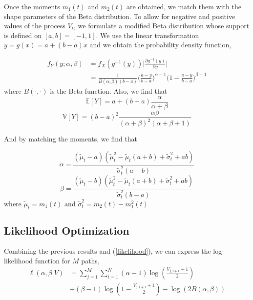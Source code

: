 \documentclass[10pt,twocolumn,letterpaper]{article}
\newcommand{\E}{\mathbb{E}}
\newcommand{\V}{\mathbb{V}}
\begin{document}
Once the moments $m_1(t)$ and $m_2(t)$ are obtained, we match them with the shape parameters of the Beta distribution. To allow for negative and positive values of the process $V_t$, we formulate a modified Beta distribution whose support is defined on $[a,b]=[-1,1]$.  We use the linear transformation $y= g(x)= a + (b-a) x $ and we obtain the probability density function,

\begin{equation}
\begin{split}
f_Y(y; \alpha , \beta )&= f_X(g^{-1}(y) ) \Big| \frac{\partial g^{-1}(y)}{\partial y }  \Big| \\
&= \frac{1}{B(\alpha, \beta) (b-a)} \Big(\frac{a-y}{b-a}\Big)^{\alpha -1}\Big(1-\frac{a-y}{b-a} \Big)^{\beta -1} \label{modified_Beta}
\end{split}
\end{equation}
where $B(\cdot,\cdot)$ is the Beta function. Also, we find that
\begin{equation}
\E[Y]= a + (b-a) \frac{\alpha}{\alpha + \beta}
\end{equation}
\begin{equation}
\V[Y]= (b-a)^2 \frac{\alpha \beta}{(\alpha + \beta)^2 (\alpha + \beta + 1)}
\end{equation}

And by matching the moments, we find that 

\begin{equation}
\alpha = \frac{(\tilde{\mu}_t-a) \left(\tilde{\mu}_t^2-\tilde{\mu}_t (a+b)+\tilde{\sigma}_t^2+a b\right)}{\tilde{\sigma}_t^2 (a-b)}
\end{equation}
\begin{equation}
\beta = \frac{(\tilde{\mu}_t-b) \left(\tilde{\mu}_t^2-\tilde{\mu}_t (a+b)+\tilde{\sigma}_t^2+a b\right)}{\tilde{\sigma}_t^2 (b-a)}
\end{equation}
where $\tilde{\mu}_t = m_1(t)$ and $\tilde{\sigma}_t^2= m_2(t)- m_1^2(t)$

\subsection{ Likelihood Optimization }

Combining the previous results and (\ref{likelihood}), we can express the log-likelihood function for $M$ paths,
\begin{equation}
\begin{split}
\ell(\alpha, \beta|V)&= \sum\limits_{j=1}^M \sum\limits_{i=1}^N (\alpha -1)\log \left(\frac{V_{j,i+1}+1}{2}\right)\\
& + (\beta -1) \log \left( 1-\frac{V_{j,i+1}+1}{2}\right) - \log \left( 2 B(\alpha, \beta)\right)\\ \label{Likelihood}
\end{split}
\end{equation} 
\end{document}
